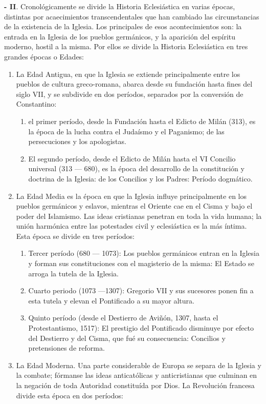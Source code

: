 \raggedbottom{} \documentclass[12pt, a4paper, openany]{book} %
\begin{document}
\textbf{- II}. Cronológicamente se divide la Historia Eclesiástica en varias épocas, distintas por acaecimientos transcendentales que han cambiado las circunstancias de la existencia de la Iglesia. Los principales de esos acontecimientos son: la entrada en la Iglesia de los pueblos germánicos, y la aparición del espíritu moderno, hostil a la misma. Por ellos se divide la Historia Eclesiástica en tres grandes épocas o Edades:
\begin{enumerate}
  \item La Edad Antigua, en que la Iglesia se extiende principalmente entre los pueblos de cultura greco-romana, abarca desde su fundación hasta fines del siglo VII, y se subdivide en dos períodos, separados por la conversión de Constantino:\begin{enumerate}
          \item el primer período, desde la Fundación hasta el Edicto de Milán (313), es la época de la lucha contra el Judaísmo y el Paganismo; de las persecuciones y los apologistas.
          \item El segundo período, desde el Edicto de Milán hasta el VI Concilio universal (313 --- 680), es la época del desarrollo de la constitución y doctrina de la Iglesia: de los Concilios y los Padres: Período dogmático.
        \end{enumerate}
  \item La Edad Media es la época en que la Iglesia influye principalmente en los pueblos germánicos y eslavos, mientras el Oriente cae en el Cisma y bajo el poder del Islamismo. Las ideas cristianas penetran en toda la vida humana; la unión harmónica entre las potestades civil y eclesiástica es la más íntima. Esta época se divide en tres períodos: \begin{enumerate}
          \item Tercer período (680 --- 1073): Los pueblos germánicos entran en la Iglesia y forman sus constituciones con el magisterio de la misma: El Estado se arroga la tutela de la Iglesia.
          \item Cuarto periodo (1073 ---1307): Gregorio VII y sus sucesores ponen fin a esta tutela y elevan el Pontificado a su mayor altura.
          \item Quinto período (desde el Destierro de Aviñón, 1307, hasta el Protestantismo, 1517): El prestigio del Pontificado disminuye por efecto del Destierro y del Cisma, que fué su consecuencia: Concilios y pretensiones de reforma.
        \end{enumerate}
  \item La Edad Moderna. Una parte considerable de Europa se separa de la Iglesia y la combate; fórmanse las ideas anticatólicas y anticristianas que culminan en la negación de toda Autoridad constituída por Dios. La Revolución francesa divide esta época en dos períodos: \begin{enumerate}

\end{enumerate}
\end{enumerate}
\end{document}
